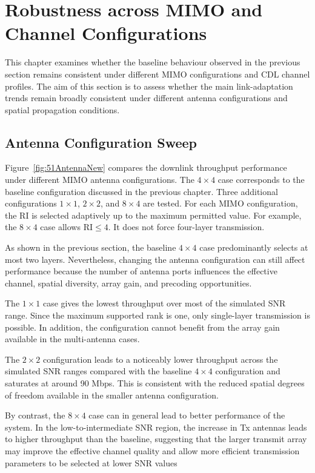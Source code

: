 \documentclass[a4paper,12pt,onecolumn]{article}
\begin{document}
	
	
	\section{Robustness across MIMO and Channel Configurations}
	\label{sec:4}
		This chapter examines whether the baseline behaviour observed in the previous section remains consistent under different MIMO configurations and CDL channel profiles. The aim of this section is to assess whether the main link-adaptation trends remain broadly consistent under different antenna configurations and spatial propagation conditions. 

		\subsection{Antenna Configuration Sweep}
		
		 Figure~\ref{fig:51AntennaNew} compares the downlink throughput performance under different MIMO antenna configurations. The $4\times4$ case corresponds to the baseline configuration discussed in the previous chapter. Three additional configurations $1 \times 1$,  $2 \times 2$, and $8\times4$ are tested. For each MIMO configuration, the RI is selected adaptively up to the maximum permitted value. For example, the \(8 \times 4\) case allows \(\mathrm{RI} \leq 4\). It does not force four-layer transmission.
		 
		As shown in the previous section, the baseline \(4 \times 4\) case predominantly selects at most two layers. Nevertheless, changing the antenna configuration can still affect performance because the number of antenna ports influences the effective channel, spatial diversity, array gain, and precoding opportunities.

		The \(1 \times 1\) case gives the lowest throughput over most of the simulated
		SNR range. Since the maximum supported rank is one, only single-layer
		transmission is possible. In addition, the configuration cannot benefit from
		the array gain available in the multi-antenna cases.
		 
		 The $2\times2$ configuration leads to a noticeably lower throughput across the simulated SNR ranges compared with the baseline $4\times4$ configuration and saturates at around 90 Mbps. This is consistent with the reduced spatial degrees of freedom available in the smaller antenna configuration.
		 
		 By contrast, the $8\times4$ case can in general lead to better performance of the system. In the low-to-intermediate SNR region, the increase in Tx antennas leads to higher throughput than the baseline, suggesting that the larger transmit array may improve the effective channel quality and allow more efficient transmission parameters to be selected at lower SNR values
		 
\end{document}
